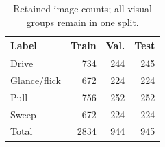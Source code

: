 \begin{table}[t]
\centering\small
\begin{tabular}{lrrr}
\toprule
Label & Train & Val. & Test \\
\midrule
Drive & 734 & 244 & 245 \\
Glance/flick & 672 & 224 & 224 \\
Pull & 756 & 252 & 252 \\
Sweep & 672 & 224 & 224 \\
Total & 2834 & 944 & 945 \\
\bottomrule
\end{tabular}
\caption{Retained image counts; all visual groups remain in one split.}
\label{tab:data}
\end{table}
